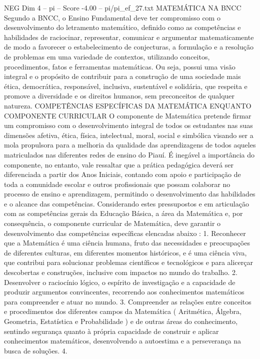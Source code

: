 \begin{textsample}{NEG Dim 4 – pi – Score -4.00 – pi/pi\_ef\_27.txt}  \label{ex:f4_neg_161}
MATEMÁTICA NA BNCC Segundo a BNCC, o Ensino Fundamental deve ter compromisso com o desenvolvimento do letramento matemático, definido como as competências e habilidades de raciocinar, representar, comunicar e argumentar matematicamente de modo a favorecer o estabelecimento de conjecturas, a formulação e a resolução de problemas em uma variedade de contextos, utilizando conceitos, procedimentos, fatos e ferramentas matemáticas.
Ou seja, possui uma visão integral e o propósito de contribuir para a construção de uma sociedade mais ética, democrática, responsável, inclusiva, sustentável e solidária, que respeita e promove a diversidade e os direitos humanos, sem preconceitos de qualquer natureza.
COMPETÊNCIAS ESPECÍFICAS DA MATEMÁTICA ENQUANTO COMPONENTE CURRICULAR O componente de Matemática pretende firmar um compromisso com o desenvolvimento integral de todos os estudantes nas suas dimensões afetiva, ética, física, intelectual, moral, social e simbólica visando ser a mola propulsora para a melhoria da qualidade das aprendizagens de todos aqueles matriculados nas diferentes redes de ensino do Piauí.
É inegável a importância do componente, no entanto, vale ressaltar que a prática pedagógica deverá ser diferenciada a partir dos Anos Iniciais, contando com apoio e participação de toda a comunidade escolar e outros profissionais que possam colaborar no processo de ensino e aprendizagem, permitindo o desenvolvimento das habilidades e o alcance das competências.
Considerando estes pressupostos e em articulação com as competências gerais da Educação Básica, a área da Matemática e, por consequência, o componente curricular de Matemática, deve garantir o desenvolvimento das competências específicas elencadas abaixo : 1.
Reconhecer que a Matemática é uma ciência humana, fruto das necessidades e preocupações de diferentes culturas, em diferentes momentos históricos, e é uma ciência viva, que contribui para solucionar problemas científicos e tecnológicos e para alicerçar descobertas e construções, inclusive com impactos no mundo do trabalho. 2.
Desenvolver o raciocínio lógico, o espírito de investigação e a capacidade de produzir argumentos convincentes, recorrendo aos conhecimentos matemáticos para compreender e atuar no mundo. 3.
Compreender as relações entre conceitos e procedimentos dos diferentes campos da Matemática ( Aritmética, Álgebra, Geometria, Estatística e Probabilidade ) e de outras áreas do conhecimento, sentindo segurança quanto à própria capacidade de construir e aplicar conhecimentos matemáticos, desenvolvendo a autoestima e a perseverança na busca de soluções. 4.

\end{textsample}
